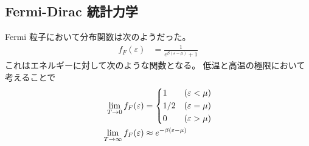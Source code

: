\documentclass[a4paper,11pt]{jlreq}
\begin{document}
\subsection{Fermi-Dirac 統計力学}
Fermi 粒子において分布関数は次のようだった。
\begin{align}
  f_F(\varepsilon) & = \frac{1}{e^{\beta(\varepsilon - \mu)} + 1}
\end{align}
これはエネルギーに対して次のような関数となる。
低温と高温の極限において考えることで
\begin{align}
  \lim_{T\to 0}f_F(\varepsilon)      & = \begin{dcases}
                                           1   & (\varepsilon < \mu) \\
                                           1/2 & (\varepsilon = \mu) \\
                                           0   & (\varepsilon > \mu)
                                         \end{dcases}           \\
  \lim_{T\to \infty}f_F(\varepsilon) & \approx e^{-\beta(\varepsilon - \mu)}
\end{align}
\end{document}
